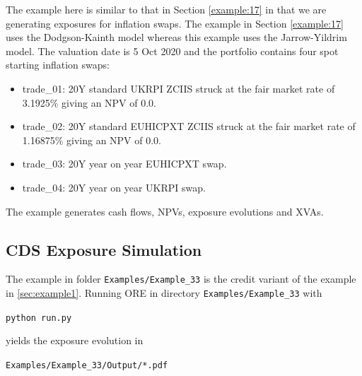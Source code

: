 \documentclass[12pt, a4paper]{article}
\begin{document}
{The example here is similar to that in Section \ref{example:17} in that we are generating exposures for inflation swaps. The example in Section \ref{example:17} uses the Dodgson-Kainth model whereas this example uses the Jarrow-Yildrim model. The valuation date is 5 Oct 2020 and the portfolio contains four spot starting inflation swaps:

\begin{itemize}
\item trade\_01: 20Y standard UKRPI ZCIIS struck at the fair market rate of 3.1925\% giving an NPV of 0.0. 
\item trade\_02: 20Y standard EUHICPXT ZCIIS struck at the fair market rate of 1.16875\% giving an NPV of 0.0.
\item trade\_03: 20Y year on year EUHICPXT swap.
\item trade\_04: 20Y year on year UKRPI swap.
\end{itemize}

The example generates cash flows, NPVs, exposure evolutions and XVAs.

\subsection{CDS Exposure Simulation}%
\label{example:33}

The example in folder {\tt Examples/Example\_33} is the credit variant of the example in
\ref{sec:example1}. Running ORE in directory {\tt Examples/Example\_33} with

\medskip
\centerline{\tt python run.py } 
\medskip

yields the exposure evolution in 

\medskip
\centerline{\tt Examples/Example\_33/Output/*.pdf } 
\medskip

}
\end{document}
